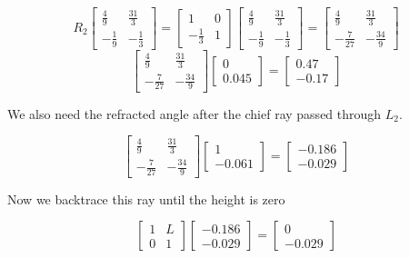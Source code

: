 \documentclass[a4paper]{article}
\begin{document}
$$R_2
\begin{bmatrix}
    \frac{4}{9} & \frac{31}{3}\\
    - \frac{1}{9} & - \frac{1}{3}
\end{bmatrix} = 
\begin{bmatrix}
    1 & 0\\
    - \frac{1}{3} & 1
\end{bmatrix} 
\begin{bmatrix}
    \frac{4}{9} & \frac{31}{3}\\
    - \frac{1}{9} & - \frac{1}{3}
\end{bmatrix} = 
\begin{bmatrix}
    \frac{4}{9} & \frac{31}{3}\\
    - \frac{7}{27} & - \frac{34}{9}
\end{bmatrix}
$$
$$
\begin{bmatrix}
    \frac{4}{9} & \frac{31}{3}\\
    - \frac{7}{27} & - \frac{34}{9}
\end{bmatrix}
\begin{bmatrix}
    0   \\
    0.045
\end{bmatrix}
=
\begin{bmatrix}
    0.47\\
    -0.17 
\end{bmatrix}
$$


We also need the refracted angle after the chief ray passed through $L_2$.

$$
\begin{bmatrix}
    \frac{4}{9} & \frac{31}{3}\\
    - \frac{7}{27} & - \frac{34}{9}
\end{bmatrix}
\begin{bmatrix}
    1   \\
    -0.061
\end{bmatrix}
=
\begin{bmatrix}
    -0.186\\
    -0.029
\end{bmatrix}
$$

Now we backtrace this ray until the height is zero

$$ 
\begin{bmatrix}
    1 & L\\
    0 & 1
\end{bmatrix}
\begin{bmatrix}
    -0.186\\
    -0.029
\end{bmatrix}
=
\begin{bmatrix}
    0 \\
    -0.029
\end{bmatrix}
$$
\end{document}
